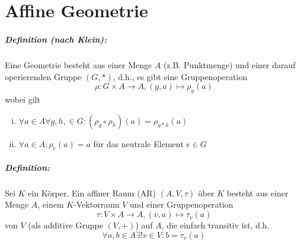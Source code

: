 \chapter{Affine Geometrie}
\paragraph{Definition (nach Klein): }
\begin{Definition}[Geometrie]
	Eine Geometrie besteht aus einer Menge $ A $ (z.B. Punktmenge) und einer darauf operierenden Gruppe $ (G,*) $, d.h.,
	es gibt eine Gruppenoperation
		\[ \rho: G\times A\to A,(g,a)\mapsto \rho_g(a)  \]
	wobei gilt
		\begin{enumerate}[(i)]
			\item $ \forall a\in A\forall g,h,\in G:(\rho_g\circ \rho_h)(a) = \rho_{g*h}(a) $
			\item $ \forall a\in A:\rho_e(a) = a $ für das neutrale Element $ e \in G $
		\end{enumerate}
\end{Definition}

\paragraph{Definition: }
\begin{Definition}
	Sei $ K $ ein Körper. Ein affiner Raum (AR) $ (A,V,\tau) $ über $ K $ besteht aus einer Menge $ A $, einem $ K $-Vektorraum $ V $ und einer Gruppenoperation
		\[ \tau:V\times A\to A,(v,a)\mapsto \tau_v(a) \]
	von $ V $ (als additive Gruppe $ (V,+) $) auf $ A $, die einfach transitiv ist, d.h.
		\[ \forall a,b\in A\exists!v\in V:b=\tau_v(a) \]
\end{Definition}

